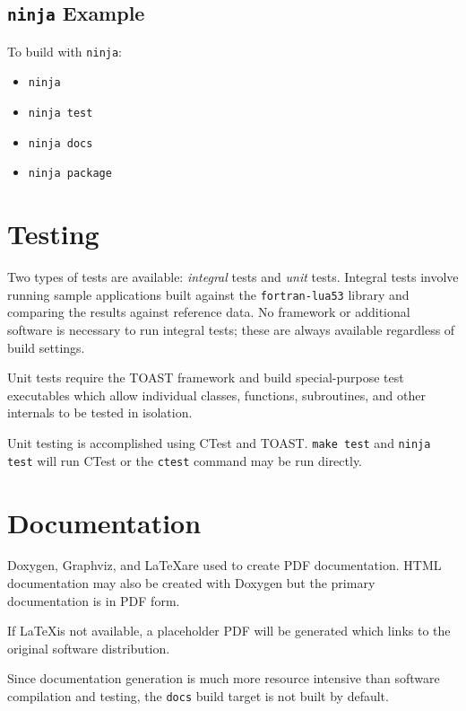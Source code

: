 \subsection{\texttt{ninja} Example}

To build with \texttt{ninja}:

\begin{itemize}
    \item \texttt{ninja}
    \item \texttt{ninja test}
    \item \texttt{ninja docs}
    \item \texttt{ninja package}
\end{itemize}

\section{Testing}

Two types of tests are available: \emph{integral} tests and \emph{unit}
tests. Integral tests involve running sample applications built against the
\texttt{fortran-lua53} library and comparing the results against reference data.
No framework or additional software is necessary to run integral tests;
these are always available regardless of build settings.

Unit tests require the TOAST framework and build special-purpose test
executables which allow individual classes, functions, subroutines, and
other internals to be tested in isolation.

Unit testing is accomplished using CTest and TOAST. \texttt{make test} and
\texttt{ninja test} will run CTest or the \texttt{ctest} command may be
run directly.


\section{Documentation}

Doxygen, Graphviz, and \LaTeX are used to create PDF
documentation. HTML documentation may also be created with Doxygen but
the primary documentation is in PDF form.

If \LaTeX is not available, a placeholder PDF will be generated which
links to the original software distribution.

Since documentation generation is much more resource intensive than
software compilation and testing, the \texttt{docs} build target is
not built by default.

